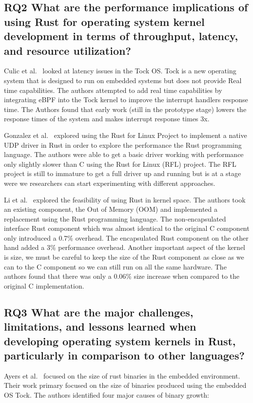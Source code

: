\documentclass[sigconf]{acmart}
\begin{document}
\subsection{RQ2  What are the performance implications of using Rust for operating system
      kernel development in terms of throughput, latency, and resource utilization?}

Culic et al.~\cite{Culic2022-bk} looked at latency issues in the Tock OS. Tock is a new operating
system that is designed to run on embedded systems but does not provide Real time capabilities. The
authors attempted to add real time capabilities by integrating eBPF into the Tock kernel to improve
the interrupt handlers response time. The Authors found that early work (still in the prototype
stage) lowers the response times of the system and makes interrupt response times 3x.

Gonzalez et al.~\cite{Gonzalez2023-ek} explored using the Rust for Linux Project to implement a
native UDP driver in Rust in order to explore the performance the Rust programming language. The
authors were able to get a basic driver working with performance only slightly slower than C using
the Rust for Linux (RFL) project. The RFL project is still to immature to get a full driver up and
running but is at a stage were we researchers can start experimenting with different
approaches.

Li et al.~\cite{Li2019-ru} explored the feasibility of using Rust in kernel space. The authors took
an existing component, the Out of Memory (OOM) and implemented a replacement using the Rust
programming language. The non-encapsulated interface Rust component which was almost identical to
the original C component only introduced a 0.7\% overhead. The encapsulated Rust component on the
other hand added a 3\% performance overhead. Another important aspect of the kernel is size, we must
be careful to keep the size of the Rust component as close as we can to the C component so we can
still run on all the same hardware. The authors found that there was only a 0.06\% size increase
when compared to the original C implementation.

\subsection{RQ3 What are the major challenges, limitations, and lessons learned when
      developing operating system kernels in Rust, particularly in comparison to other languages?}

Ayers et al.~\cite{Ayers2022-sf} focused on the size of rust binaries in the embedded
environment. Their work primary focused on the size of binaries produced using the embedded OS
Tock. The authors identified four major causes of binary growth:
\end{document}
